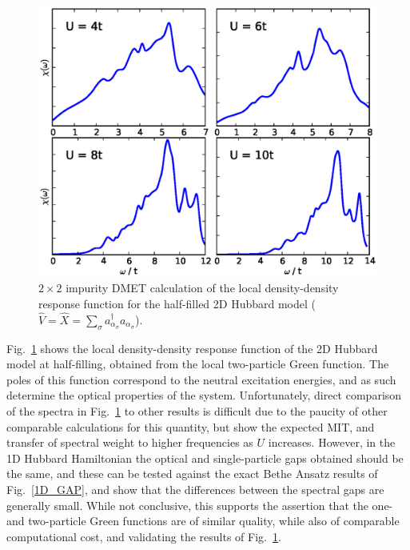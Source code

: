 \documentclass[aps,twocolumn,nobibnotes]{revtex4}
\begin{document}
\begin{figure}
\begin{center}
    \vspace{-2mm}
\includegraphics[scale=0.425]{2D_DD_Spectra.eps}
\end{center}
    \vspace{-8mm}
\caption{$2 \times 2$ impurity DMET calculation of the local density-density response function for the half-filled 2D Hubbard model 
(${\hat V}={\hat X}=\sum_{\sigma} a_{\alpha_{\sigma}}^{\dagger}a_{\alpha_{\sigma}}$).}
\label{2D_DD}
\end{figure}


Fig.~\ref{2D_DD} shows the local density-density response function of the 2D Hubbard model at half-filling, obtained from the local two-particle Green 
function. The poles of this 
function correspond to the neutral excitation energies, and as such determine 
the optical properties of the system\cite{Millis2012,Essler91}.
Unfortunately, direct comparison of the spectra in Fig.~\ref{2D_DD} to other results is difficult due to the paucity of other comparable 
calculations for this quantity, but show the expected MIT, and transfer of spectral weight to higher frequencies as $U$ increases.
However, in the 1D Hubbard Hamiltonian
the optical and single-particle gaps obtained should be the same, and these can be tested against the exact Bethe Ansatz results
of Fig.~\ref{1D_GAP},
and show that the differences between the spectral gaps are generally small\cite{Essler91}.
While not conclusive, this supports the assertion that the one- and two-particle Green functions are of similar quality, 
while also of comparable computational cost, and validating the results of Fig.~\ref{2D_DD}.
\end{document}
